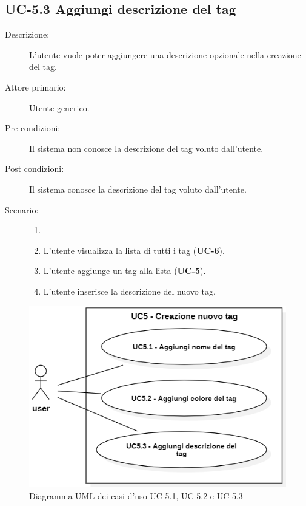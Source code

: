 \subsection{UC-5.3 Aggiungi descrizione del tag}
\begin{description}
    \item[Descrizione:] L’utente vuole poter aggiungere una descrizione opzionale nella creazione del tag.
    \item[Attore primario:] Utente generico.
    \item[Pre condizioni:] Il sistema non conosce la descrizione  del tag voluto dall’utente.
    \item[Post condizioni:] Il sistema conosce la descrizione del tag voluto dall’utente.
    \item[Scenario:]
    \begin{enumerate}
        \item[]
        \item L’utente visualizza la lista di tutti i tag (\textbf{UC-6}).
        \item L'utente aggiunge un tag alla lista (\textbf{UC-5}).
        \item L'utente inserisce la descrizione del nuovo tag.
    \end{enumerate}
\end{description}
\begin{figure}[H]
    \centering
    \includegraphics[width=0.8\linewidth]{UC5.1-2-3.png} %
    \caption{Diagramma UML dei casi d'uso UC-5.1, UC-5.2 e UC-5.3}
    \label{fig:UC7.1-2-3}
\end{figure}


